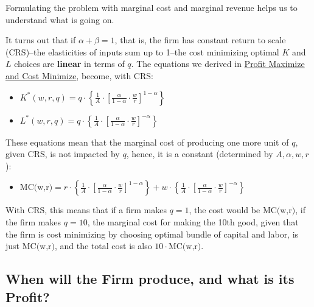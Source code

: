 \documentclass[
]{book}
\providecommand{\tightlist}{%
  \setlength{\itemsep}{0pt}\setlength{\parskip}{0pt}}
\begin{document}
Formulating the problem with marginal cost and marginal revenue helps us
to understand what is going on.

It turns out that if \(\alpha +\beta =1\), that is, the firm has constant
return to scale (CRS)--the elasticities of inputs sum up to 1--the cost
minimizing optimal \(K\) and \(L\) choices are \textbf{linear} in terms of \(q\).
The equations we derived in \href{https://fanwangecon.github.io/Math4Econ/opti_firm_constrained/profit_maximize.html}{Profit Maximize and Cost
Minimize},
become, with CRS:

\begin{itemize}
\item
  \(\displaystyle K^* (w,r,q)=q\cdot \left\lbrace \frac{1}{A}\cdot {\left\lbrack \frac{\alpha }{1-\alpha }\cdot \frac{w}{r}\right\rbrack }^{1-\alpha } \right\rbrace\)
\item
  \(\displaystyle L^* (w,r,q)=q\cdot \left\lbrace \frac{1}{A}\cdot {\left\lbrack \frac{\alpha }{1-\alpha }\cdot \frac{w}{r}\right\rbrack }^{-\alpha } \right\rbrace\)
\end{itemize}

These equations mean that the marginal cost of producing one more unit
of \(q\), given CRS, is not impacted by \(q\), hence, it is a constant
(determined by \(A,\alpha ,w,r\)):

\begin{itemize}
\tightlist
\item
  \(\displaystyle \textrm{MC(w,r)}=r\cdot \left\lbrace \frac{1}{A}\cdot {\left\lbrack \frac{\alpha }{1-\alpha }\cdot \frac{w}{r}\right\rbrack }^{1-\alpha } \right\rbrace +w\cdot \left\lbrace \frac{1}{A}\cdot {\left\lbrack \frac{\alpha }{1-\alpha }\cdot \frac{w}{r}\right\rbrack }^{-\alpha } \right\rbrace\)
\end{itemize}

With CRS, this means that if a firm makes \(q=1\), the cost would be
\(\textrm{MC(w,r)}\), if the firm makes \(q=10\), the marginal cost for
making the 10th good, given that the firm is cost minimizing by choosing
optimal bundle of capital and labor, is just \(\textrm{MC(w,r)}\), and the
total cost is also \(10\cdot \textrm{MC(w,r)}\).

\hypertarget{when-will-the-firm-produce-and-what-is-its-profit}{%
\subsection{When will the Firm produce, and what is its Profit?}\label{when-will-the-firm-produce-and-what-is-its-profit}}
\end{document}
